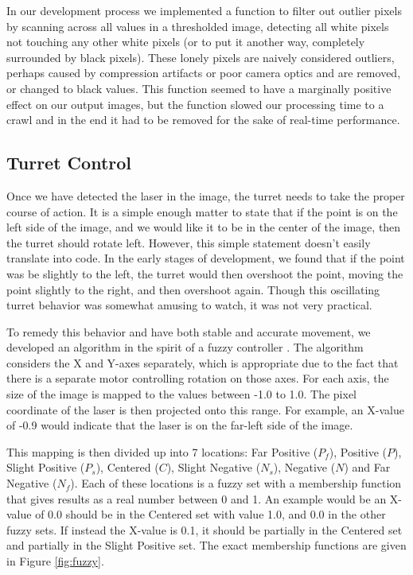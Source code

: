 \documentclass[10pt,twocolumn,letterpaper]{article}
\begin{document}
In our development process we implemented a function to filter out outlier pixels by scanning across all values in a thresholded image, detecting all white pixels not touching any other white pixels (or to put it another way, completely surrounded by black pixels).  These lonely pixels are naively considered outliers, perhaps caused by compression artifacts or poor camera optics and are removed, or changed to black values.  This function seemed to have a marginally positive effect on our output images, but the function slowed our processing time to a crawl and in the end it had to be removed for the sake of real-time performance.

\subsection{Turret Control}

Once we have detected the laser in the image, the turret needs to take the proper course of action. It is a simple enough matter to state that if the point is on the left side of the image, and we would like it to be in the center of the image, then the turret should rotate left. However, this simple statement doesn't easily translate into code.  In the early stages of development, we found that if the point was be slightly to the left, the turret would then overshoot the point, moving the point slightly to the right, and then overshoot again. Though this oscillating turret behavior was somewhat amusing to watch, it was not very practical.

To remedy this behavior and have both stable and accurate movement, we developed an algorithm in the spirit of a fuzzy controller \cite{jantzen98Logic}. The algorithm considers the X and Y-axes separately, which is appropriate due to the fact that there is a separate motor controlling rotation on those axes. For each axis, the size of the image is mapped to the values between -1.0 to 1.0. The pixel coordinate of the laser is then projected onto this range. For example, an X-value of -0.9 would indicate that the laser is on the far-left side of the image.

This mapping is then divided up into 7 locations:  Far Positive ($P_f$), Positive ($P$), Slight Positive ($P_s$), Centered ($C$), Slight Negative ($N_s$), Negative ($N$) and Far Negative ($N_f$). Each of these locations is a fuzzy set with a membership function that gives results as a real number between 0 and 1. An example would be an X-value of 0.0 should be in the Centered set with value 1.0, and 0.0 in the other fuzzy sets. If instead the X-value is 0.1, it should be partially in the Centered set and partially in the Slight Positive set. The exact membership functions are given in Figure \ref{fig:fuzzy}.
\end{document}
